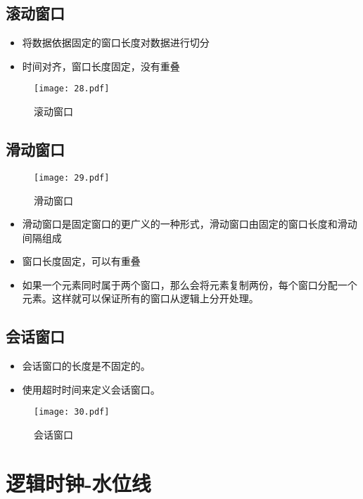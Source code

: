 \documentclass[cn,11pt,chinese]{elegantbook}
\begin{document}
\section{滚动窗口}

\begin{itemize}
  \item 将数据依据固定的窗口长度对数据进行切分
  \item 时间对齐，窗口长度固定，没有重叠
\end{itemize}

\clearpage
\begin{figure}[htbp]
  \centering
  \texttt{[image: 28.pdf]}
  \caption{滚动窗口}
\end{figure}

\section{滑动窗口}

\begin{figure}[htbp]
  \centering
  \texttt{[image: 29.pdf]}
  \caption{滑动窗口}
\end{figure}

\begin{itemize}
  \item 滑动窗口是固定窗口的更广义的一种形式，滑动窗口由固定的窗口长度和滑动间隔组成
  \item 窗口长度固定，可以有重叠
  \item 如果一个元素同时属于两个窗口，那么会将元素复制两份，每个窗口分配一个元素。这样就可以保证所有的窗口从逻辑上分开处理。
\end{itemize}

\section{会话窗口}

\begin{itemize}
  \item 会话窗口的长度是不固定的。
  \item 使用超时时间来定义会话窗口。
\end{itemize}

\begin{figure}[htbp]
	\centering
	\texttt{[image: 30.pdf]}
  \caption{会话窗口}
\end{figure}

\chapter{逻辑时钟-水位线}
\end{document}
